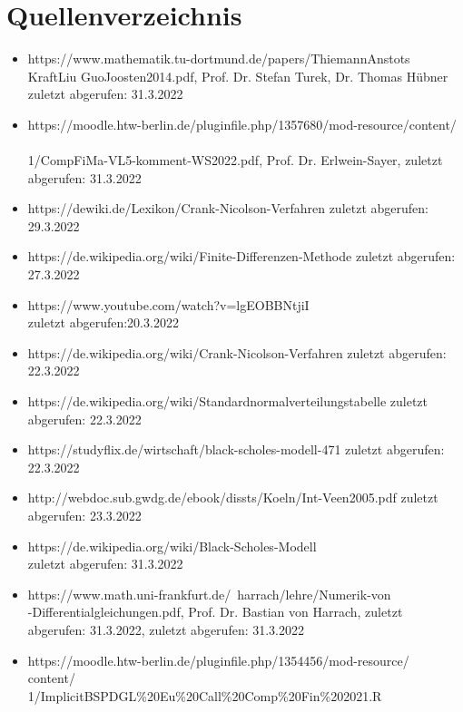 \documentclass[12pt,titlepage]{article}
\begin{document}
\section{Quellenverzeichnis}
\begin{itemize}
\item https://www.mathematik.tu-dortmund.de/papers/ThiemannAnstots\\KraftLiu GuoJoosten2014.pdf, Prof. Dr. Stefan Turek,
Dr. Thomas Hübner zuletzt abgerufen: 31.3.2022
\item https://moodle.htw-berlin.de/pluginfile.php/1357680/mod-resource/content/\\\\1/CompFiMa-VL5-komment-WS2022.pdf, Prof. Dr. Erlwein-Sayer, zuletzt abgerufen: 31.3.2022
\item https://dewiki.de/Lexikon/Crank-Nicolson-Verfahren zuletzt abgerufen: 29.3.2022
\item https://de.wikipedia.org/wiki/Finite-Differenzen-Methode zuletzt abgerufen: 27.3.2022
\item https://www.youtube.com/watch?v=lgEOBBNtjiI \\zuletzt abgerufen:20.3.2022
\item https://de.wikipedia.org/wiki/Crank-Nicolson-Verfahren zuletzt abgerufen: 22.3.2022
\item https://de.wikipedia.org/wiki/Standardnormalverteilungstabelle zuletzt abgerufen: 22.3.2022
\item https://studyflix.de/wirtschaft/black-scholes-modell-471 zuletzt abgerufen: 22.3.2022
\item http://webdoc.sub.gwdg.de/ebook/dissts/Koeln/Int-Veen2005.pdf zuletzt abgerufen: 23.3.2022
\item https://de.wikipedia.org/wiki/Black-Scholes-Modell\\ zuletzt abgerufen: 31.3.2022
\item https://www.math.uni-frankfurt.de/~harrach/lehre/Numerik-von\\ -Differentialgleichungen.pdf, Prof. Dr. Bastian von Harrach, zuletzt abgerufen: 31.3.2022, zuletzt abgerufen: 31.3.2022
\item https://moodle.htw-berlin.de/pluginfile.php/1354456/mod-resource/\\content/\\1/ImplicitBSPDGL\%20Eu\%20Call\%20Comp\%20Fin\%202021.R

\end{itemize}
\end{document}
